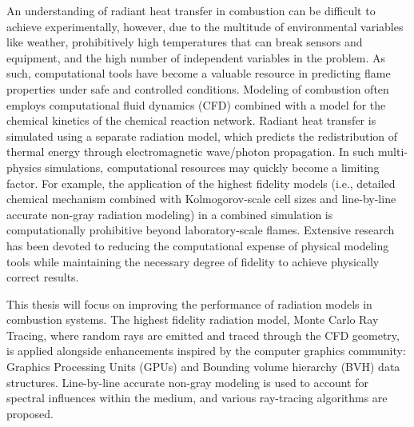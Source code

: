 An understanding of radiant heat transfer in combustion can be difficult to achieve experimentally, however, due to the multitude of environmental variables like weather, prohibitively high temperatures that can break sensors and equipment, and the high number of independent variables in the problem. As such, computational tools have become a valuable resource in predicting flame properties under safe and controlled conditions. Modeling of combustion often employs computational fluid dynamics (CFD) combined with a model for the chemical kinetics of the chemical reaction network. Radiant heat transfer is simulated using a separate radiation model, which predicts the redistribution of thermal energy through electromagnetic wave/photon propagation. In such multi-physics simulations, computational resources may quickly become a limiting factor. For example, the application of the highest fidelity models (i.e., detailed chemical mechanism combined with Kolmogorov-scale cell sizes and line-by-line accurate non-gray radiation modeling) in a combined simulation is computationally prohibitive beyond laboratory-scale flames. Extensive research has been devoted to reducing the computational expense of physical modeling tools while maintaining the necessary degree of fidelity to achieve physically correct results.

This thesis will focus on improving the performance of radiation models in combustion systems. The highest fidelity radiation model, Monte Carlo Ray Tracing, where random rays are emitted and traced through the CFD geometry, is applied alongside enhancements inspired by the computer graphics community: Graphics Processing Units (GPUs) and Bounding volume hierarchy (BVH) data structures. Line-by-line accurate non-gray modeling is used to account for spectral influences within the medium, and various ray-tracing algorithms are proposed. 



